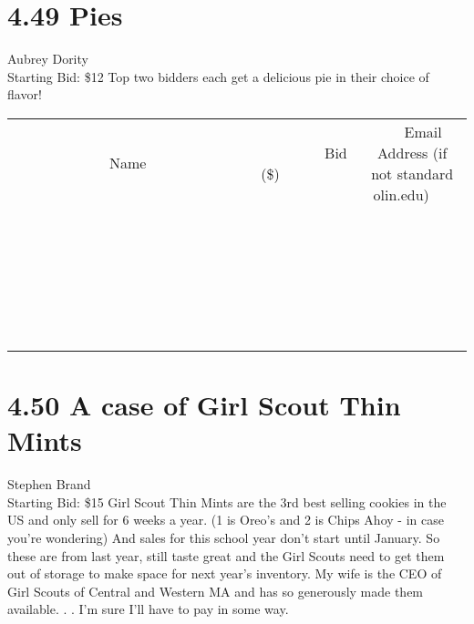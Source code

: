 \documentclass[11pt]{article}
\begin{document}
\section*{4.49 Pies}
Aubrey Dority
\\
Starting Bid: \$12
\newline
Top two bidders each get a delicious pie in their choice of flavor!
\\[6ex]
\begin{tabular}{c c c}
~~~~~~~~~~~~~Name~~~~~~~~~~~~~ & ~~~~~~~~~Bid (\$)~~~~~~~~~  & ~~~Email Address (if not standard olin.edu)~~~\\
 & & \\
\hline
 & & \\
\hline
 & & \\
\hline
 & & \\
\hline
 & & \\
\hline
 & & \\
\hline
 & & \\
\hline
 & & \\
\hline
 & & \\
\hline
 & & \\
\hline
 & & \\
\hline
 & & \\
\hline
 & & \\
\hline
 & & \\
\hline
 & & \\
\hline
 & & \\
\hline
 & & \\
\hline
 & & \\
\hline
 & & \\
\hline
 & & \\
\hline
 & & \\
\hline
 & & \\
\hline
 & & \\
\hline
 & & \\
\hline
 & & \\
\hline
 & & \\
\hline
\end{tabular}
\newpage
\section*{4.50 A case of Girl Scout Thin Mints}
Stephen Brand
\\
Starting Bid: \$15
\newline
Girl Scout Thin Mints are the 3rd best selling cookies in the US and only sell for 6 weeks a year. (1 is Oreo's and 2 is Chips Ahoy - in case you're wondering) And sales for this school year don't start until January.  So these are from last year, still taste great and the Girl Scouts need to get them out of storage to make space for next year's inventory.  My wife is the CEO of Girl Scouts of Central and Western MA and has so generously made them available. . . I'm sure I'll have to pay in some way.  
\end{document}
